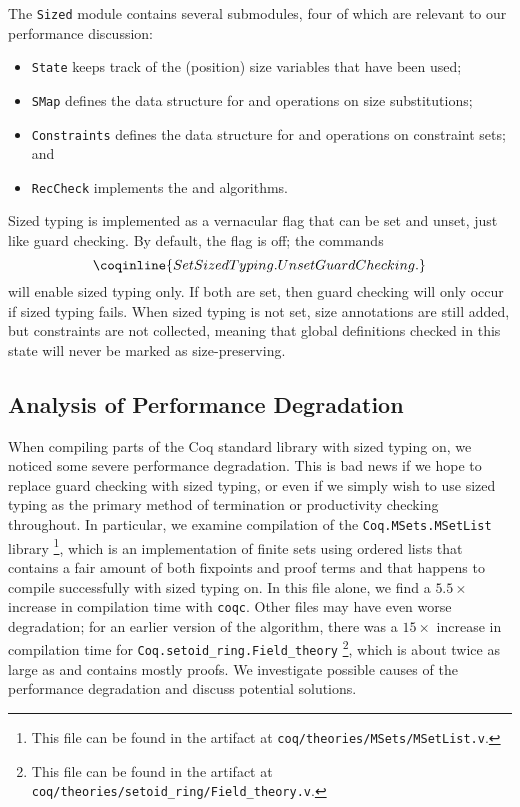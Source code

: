 The \texttt{Sized} module contains several submodules, four of which are relevant to our performance discussion:
\begin{itemize}
  \item \texttt{State} keeps track of the (position) size variables that have been used;
  \item \texttt{SMap} defines the data structure for and operations on size substitutions;
  \item \texttt{Constraints} defines the data structure for and operations on constraint sets; and
  \item \texttt{RecCheck} implements the \RecCheck and \solve algorithms.
\end{itemize}

Sized typing is implemented as a vernacular flag that can be set and unset, just like guard checking.
By default, the flag is off; the commands
$$\coqinline{Set Sized Typing. Unset Guard Checking.}$$
will enable sized typing only.
If both are set, then guard checking will only occur if sized typing fails.
When sized typing is not set, size annotations are still added, but constraints are not collected,
meaning that global definitions checked in this state will never be marked as size-preserving.

\subsection{Analysis of Performance Degradation}

When compiling parts of the Coq standard library with sized typing on, we noticed some severe performance degradation.
This is bad news if we hope to replace guard checking with sized typing,
or even if we simply wish to use sized typing as the primary method of termination or productivity checking throughout.
In particular, we examine compilation of the \texttt{Coq.MSets.MSetList} library%
\footnote{This file can be found in the artifact at \texttt{coq/theories/MSets/MSetList.v}.},
which is an implementation of finite sets using ordered lists
that contains a fair amount of both fixpoints and proof terms
and that happens to compile successfully with sized typing on.
In this file alone, we find a $5.5\times$ increase in compilation time with \texttt{coqc}.
Other files may have even worse degradation; for an earlier version of the algorithm,
there was a $15\times$ increase in compilation time for \texttt{Coq.setoid\_ring.Field\_theory}%
\footnote{This file can be found in the artifact at \texttt{coq/theories/setoid\_ring/Field\_theory.v}.},
which is about twice as large as \msetlist and contains mostly proofs.
We investigate possible causes of the performance degradation and discuss potential solutions.

